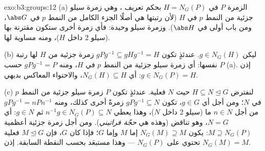\begin{solution}{exo:b3:groups:12}
(a) الزمرة $P$  في $H = N_G(P)$ بحكم تعريف ، وهي
زمرة سيلو جزئية من النمط $p$ في $H$ (لأن رتبتها هي أصلًا الجزء
الكامل من النمط $p$ في $\abs G$، ومن باب أولى في $\abs H$). وزمرة
سيلو  وحيدة: فأي زمرة أخرى ستكون مقترنة بها (سيلو 2 داخل
$H$)، ومنه مساوية لها.

(b) ليكن $g \in N_G(H)$. عندئذٍ تكون $gPg^{-1} \subseteq gHg^{-1} = H$ زمرة جزئية من $H$
لها رتبة $P$ نفسها: أي زمرة سيلو جزئية من النمط $p$ في $H$، ومنه
$gPg^{-1} = P$ حسب (a). إذن $g \in
N_G(P) = H$: أي $N_G(H) \subseteq H$، والاحتواء
المعاكس بديهي.

(c) لنفترض $H \subseteq N \trianglelefteq G$ حيث $N$ فعلية. عندئذٍ تكون $P$ زمرة سيلو
جزئية من النمط $p$ في $N$؛ ومن أجل أي $g \in G$، تكون $gPg^{-1} \subseteq N$
زمرةً أخرى كذلك، ومنه $gPg^{-1} = nPn^{-1}$ من أجل $n \in N$ ما (سيلو 2 داخل
$N$)، وهذا يعطي $n^{-1}g \in N_G(P)
\subseteq N$ ثم $g \in N$: أي $N = G$، وهو تناقض
(وهذه هي \emph{حجّة فراتيني}). ومن أجل زمرة جزئية أعظمية $M \supseteq
N_G(P)$:
يكون $N_G(M) \supseteq M$ إما $M$ وإما $G$؛ فإذا كان $G$، فإن $M \trianglelefteq G$  فعلية تحتوي على $N_G(P)$ --- وهذا مستبعَد بحسب
النقطة السابقة. إذن $N_G(M) = M$.
\end{solution}

